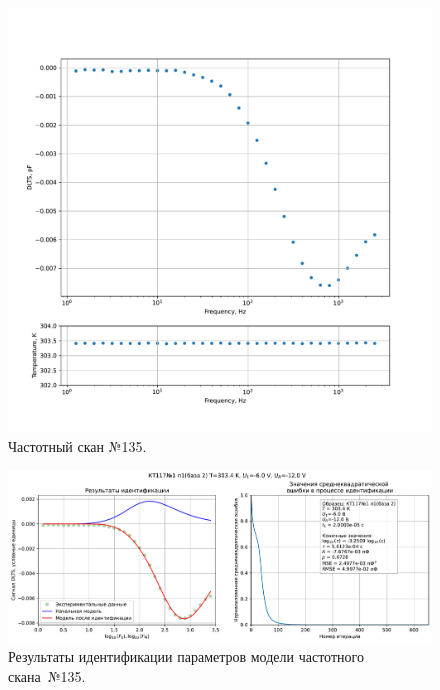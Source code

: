\begin{figure}[!ht]
    \centering
    \includegraphics[width=1\textwidth]{../plots/КТ117№1_п1(база 2)_2500Гц-1Гц_1пФ_+30С_-6В-12В_100мВ_20мкс_шаг_0,1.pdf}
    \caption{Частотный скан №135.}
    \label{pic:frequency_scan_135}
\end{figure}

\begin{figure}[!ht]
    \centering
    \includegraphics[width=1\textwidth]{../plots/КТ117№1_п1(база 2)_2500Гц-1Гц_1пФ_+30С_-6В-12В_100мВ_20мкс_шаг_0,1_model.pdf}
    \caption{Результаты идентификации параметров модели частотного скана~№135.}
    \label{pic:frequency_scan_model135}
\end{figure}

\pagebreak



